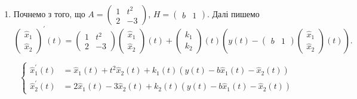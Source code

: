 \begin{solution}
    \begin{enumerate}
        \item Почнемо з того, що $A = \begin{pmatrix} 1 & t^2 \\ 2 & -3 \end{pmatrix}$, $H = \begin{pmatrix} b & 1 \end{pmatrix}$. Далі пишемо
        \[ \begin{pmatrix} \hat x_1 \\ \hat x_2 \end{pmatrix}^\prime (t) = \begin{pmatrix} 1 & t^2 \\ 2 & -3 \end{pmatrix} \begin{pmatrix} \hat x_1 \\ \hat x_2 \end{pmatrix} (t) + \begin{pmatrix} k_1 \\ k_2 \end{pmatrix} (t) \left( y(t) - \begin{pmatrix} b & 1 \end{pmatrix} \begin{pmatrix} \hat x_1 \\ \hat x_2 \end{pmatrix} (t) \right) .\]
        
        \begin{equation*}
            \left\{
                \begin{aligned}
                    \hat x_1^\prime (t) &= \hat x_1 (t) + t^2 \hat x_2 (t) + k_1(t) (y(t) - b \hat x_1(t) - \hat x_2(t)) \\
                    \hat x_2^\prime (t) &= 2 \hat x_1 (t) - 3 \hat x_2 (t) + k_2(t) (y(t) - b \hat x_1(t) - \hat x_2(t))
                \end{aligned}
            \right.
        \end{equation*}
        

\end{enumerate}
\end{solution}
